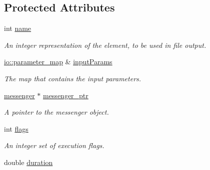 \subsection*{Protected Attributes}
\begin{DoxyCompactItemize}
\item 
\hypertarget{classbases_1_1element_a52af85c34174ec732a3feb6a7e63fbc6}{int \hyperlink{classbases_1_1element_a52af85c34174ec732a3feb6a7e63fbc6}{name}}\label{classbases_1_1element_a52af85c34174ec732a3feb6a7e63fbc6}

\begin{DoxyCompactList}\small\item\em An integer representation of the element, to be used in file output. \end{DoxyCompactList}\item 
\hypertarget{classbases_1_1element_adac9bb89cc00150c2546e9880e0f677a}{\hyperlink{namespaceio_a1c55c654666eeece6a9724f453fdbd87}{io\-::parameter\-\_\-map} \& \hyperlink{classbases_1_1element_adac9bb89cc00150c2546e9880e0f677a}{input\-Params}}\label{classbases_1_1element_adac9bb89cc00150c2546e9880e0f677a}

\begin{DoxyCompactList}\small\item\em The map that contains the input parameters. \end{DoxyCompactList}\item 
\hypertarget{classbases_1_1element_a0ca8319905d8702294384d940a5cf0f7}{\hyperlink{classbases_1_1messenger}{messenger} $\ast$ \hyperlink{classbases_1_1element_a0ca8319905d8702294384d940a5cf0f7}{messenger\-\_\-ptr}}\label{classbases_1_1element_a0ca8319905d8702294384d940a5cf0f7}

\begin{DoxyCompactList}\small\item\em A pointer to the messenger object. \end{DoxyCompactList}\item 
\hypertarget{classbases_1_1element_ae96e3c9a7a8c0aa53e6f98e62ecf23af}{int \hyperlink{classbases_1_1element_ae96e3c9a7a8c0aa53e6f98e62ecf23af}{flags}}\label{classbases_1_1element_ae96e3c9a7a8c0aa53e6f98e62ecf23af}

\begin{DoxyCompactList}\small\item\em An integer set of execution flags. \end{DoxyCompactList}\item 
\hypertarget{classbases_1_1element_a47315779623a1472300076f4df1c713b}{double \hyperlink{classbases_1_1element_a47315779623a1472300076f4df1c713b}{duration}}\label{classbases_1_1element_a47315779623a1472300076f4df1c713b}


\end{DoxyCompactItemize}

